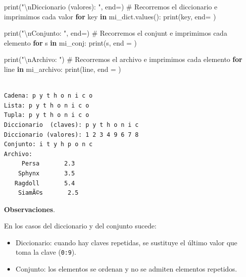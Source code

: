 \documentclass[
  spanish,
  letterpaper,
]{scrbook}
\newenvironment{Shaded}{\begin{snugshade}}{\end{snugshade}}
\newcommand{\BuiltInTok}[1]{\textcolor[rgb]{0.00,0.23,0.31}{#1}}
\newcommand{\CharTok}[1]{\textcolor[rgb]{0.13,0.47,0.30}{#1}}
\newcommand{\CommentTok}[1]{\textcolor[rgb]{0.37,0.37,0.37}{#1}}
\newcommand{\ControlFlowTok}[1]{\textcolor[rgb]{0.00,0.23,0.31}{\textbf{#1}}}
\newcommand{\KeywordTok}[1]{\textcolor[rgb]{0.00,0.23,0.31}{\textbf{#1}}}
\newcommand{\NormalTok}[1]{\textcolor[rgb]{0.00,0.23,0.31}{#1}}
\newcommand{\OperatorTok}[1]{\textcolor[rgb]{0.37,0.37,0.37}{#1}}
\newcommand{\StringTok}[1]{\textcolor[rgb]{0.13,0.47,0.30}{#1}}
\providecommand{\tightlist}{%
  \setlength{\itemsep}{0pt}\setlength{\parskip}{0pt}}
\theoremstyle{definition}
\theoremstyle{remark}
\begin{document}
\begin{Shaded}
\begin{Highlighting}[]
\BuiltInTok{print}\NormalTok{(}\StringTok{"}\CharTok{\textbackslash{}n}\StringTok{Diccionario (valores): "}\NormalTok{, end}\OperatorTok{=}\StringTok{\textquotesingle{}\textquotesingle{}}\NormalTok{) }
\CommentTok{\# Recorremos el diccionario e imprimimos cada valor }
\ControlFlowTok{for}\NormalTok{ key }\KeywordTok{in}\NormalTok{ mi\_dict.values():}
    \BuiltInTok{print}\NormalTok{(key, end}\OperatorTok{=}\StringTok{\textquotesingle{} \textquotesingle{}}\NormalTok{)}

\BuiltInTok{print}\NormalTok{(}\StringTok{"}\CharTok{\textbackslash{}n}\StringTok{Conjunto: "}\NormalTok{, end}\OperatorTok{=}\StringTok{\textquotesingle{}\textquotesingle{}}\NormalTok{) }
\CommentTok{\# Recorremos el conjunt e imprimimos cada elemento }
\ControlFlowTok{for}\NormalTok{ s }\KeywordTok{in}\NormalTok{ mi\_conj:}
    \BuiltInTok{print}\NormalTok{(s, end }\OperatorTok{=} \StringTok{\textquotesingle{} \textquotesingle{}}\NormalTok{)}
    
\BuiltInTok{print}\NormalTok{(}\StringTok{"}\CharTok{\textbackslash{}n}\StringTok{Archivo: "}\NormalTok{) }
\CommentTok{\# Recorremos el archivo e imprimimos cada elemento }
\ControlFlowTok{for}\NormalTok{ line }\KeywordTok{in}\NormalTok{ mi\_archivo:}
    \BuiltInTok{print}\NormalTok{(line, end }\OperatorTok{=} \StringTok{\textquotesingle{}\textquotesingle{}}\NormalTok{)}
\end{Highlighting}
\end{Shaded}

\begin{verbatim}

Cadena: p y t h o n i c o 
Lista: p y t h o n i c o 
Tupla: p y t h o n i c o 
Diccionario  (claves): p y t h o n i c 
Diccionario (valores): 1 2 3 4 9 6 7 8 
Conjunto: i t y h p o n c 
Archivo: 
     Persa       2.3
    Sphynx       3.5
   Ragdoll       5.4
    SiamÃ©s       2.5
\end{verbatim}

\textbf{Observaciones}.

En los casos del diccionario y del conjunto sucede:

\begin{itemize}
\tightlist
\item
  Diccionario: cuando hay claves repetidas, se sustituye el último valor
  que toma la clave (\texttt{\textquotesingle{}0\textquotesingle{}:9}).
\item
  Conjunto: los elementos se ordenan y no se admiten elementos
  repetidos.
\end{itemize}
\end{document}
